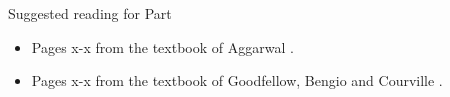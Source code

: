 
\begin{frame}{Suggested reading for Part \thispart}

\begin{itemize}
    \small
    \item Pages x-x from the textbook of Aggarwal \cite{Aggarwal:2018SpringerDL}.
    \item Pages x-x from the textbook of Goodfellow, Bengio and Courville \cite{Goodfellow:2017MITDL}.
\end{itemize}

\end{frame}